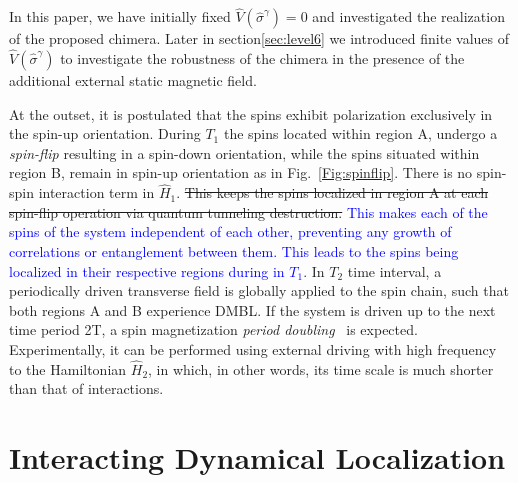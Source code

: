 \documentclass[%
reprint,
superscriptaddress,
amsmath,amssymb,showkeys,
aps,
prb,
]{revtex4-2}
\newcommand{\blue}[1]{\textcolor{blue}{#1}}
\begin{document}
	In this paper, we have initially fixed $\hat{V}(\hat{\sigma}^\gamma)=0$ and investigated the realization of the proposed chimera. Later in section\ref{sec:level6} we introduced finite values of $\hat{V}(\hat{\sigma}^\gamma)$ to investigate the robustness of the chimera in the presence of the additional external static magnetic field.
	
	At the outset, it is postulated that the spins exhibit polarization exclusively in the spin-up orientation. During $T_1$ the spins located within region A, undergo a \textit{spin-flip} resulting in a spin-down orientation, while the spins situated within region B, remain in spin-up orientation as in Fig.~\ref{Fig:spinflip}. There is no spin-spin interaction term in $\hat{H}_1$. \sout{This keeps the spins localized in region A at each spin-flip operation via quantum tunneling destruction.} \blue{This makes each of the spins of the system independent of each other, preventing any growth of correlations or entanglement between them. This leads to the spins being localized in their respective regions during in $T_1$}. In $T_2$ time interval, a periodically driven transverse field is globally applied to the spin chain, such that both regions A and B experience DMBL. If the system is driven up to the next time period 2T, a spin magnetization \textit{period doubling}~\cite{rovny_31mathrmp_2018, Pan2020} is expected. Experimentally, it can be performed using external driving with high frequency to the Hamiltonian $\hat{H}_2$, in which, in other words, its time scale is much shorter than that of interactions.~\cite{choi_observation_2017,zhang_observation_2017,Cirac_1995,Blatt_2012}
	
	\section{\label{sec:level2} Interacting Dynamical Localization}
	
\end{document}
